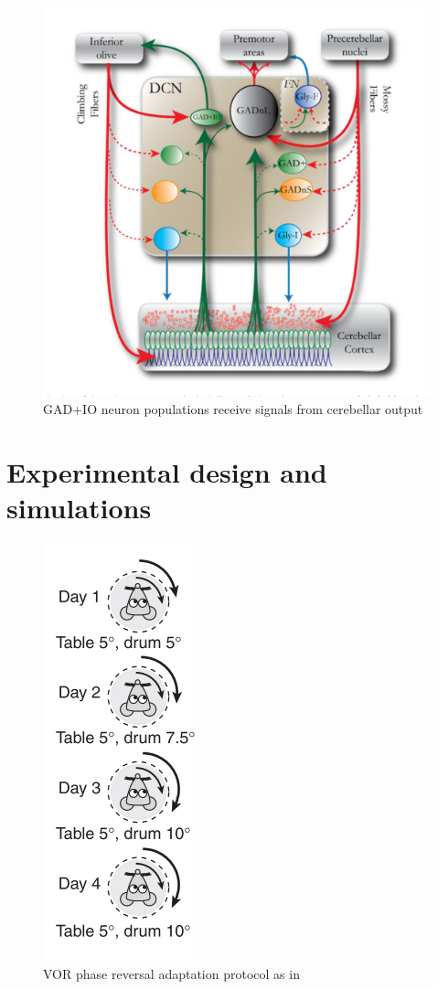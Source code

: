 \documentclass[12pt, a4paper,twoside]{tesi_upf}
\begin{document}
\begin{figure}
  \centering
  \includegraphics[scale=0.50]{images/uusisaari.png}
  \caption[GAD+IO neuron populations receive signals from cerebellar output]{GAD+IO neuron populations receive signals from cerebellar output \cite{Uusisaari2011}}
  \label{fig:uusisaari}
\end{figure}

\section{Experimental design and simulations}

\begin{figure}
  \centering
  \includegraphics[scale=0.50]{images/vvor.png}
  \caption[VOR phase reversal adaptation protocol]{VOR phase reversal adaptation protocol as in \cite{Wulff2009a}}
  \label{fig:vvor}
\end{figure}
\end{document}
